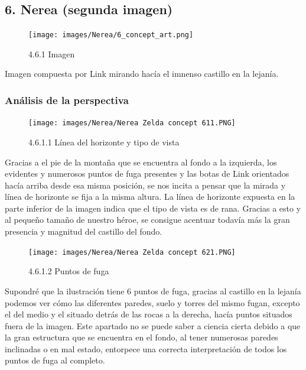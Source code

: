 \documentclass[12pt]{article}
\begin{document}

    \subsection{6. Nerea (segunda imagen)}
    \begin{figure}[H]
      \centering
      \texttt{[image: images/Nerea/6\_concept\_art.png]}
      \caption{\small 4.6.1 Imagen}
    \end{figure}
    Imagen compuesta por Link mirando hacía el imnenso castillo en la lejanía.

    
        \subsubsection{Análisis de la perspectiva}


    \begin{figure}[H]
      \centering
      \texttt{[image: images/Nerea/Nerea Zelda concept 611.PNG]}
      \caption{\small 4.6.1.1 Línea del horizonte y tipo de vista}
    \end{figure}

    Gracias a el pie de la montaña que se encuentra al fondo a la izquierda, los evidentes y numerosos puntos de fuga presentes y las botas de Link orientados hacía arriba desde esa misma posición, se nos incita a pensar que la mirada y línea de horizonte se fija a la misma altura. La línea de horizonte expuesta en la parte inferior de la imagen indica que el tipo de vista es de rana. 
    Gracias a esto y al pequeño tamaño de nuestro héroe, se consigue acentuar todavía más la gran presencia y magnitud del castillo del fondo.

    \begin{figure}[H]
      \centering
      \texttt{[image: images/Nerea/Nerea Zelda concept 621.PNG]}
      \caption{\small 4.6.1.2 Puntos de fuga}
    \end{figure}

    Supondré que la ilustración tiene 6 puntos de fuga, gracias al castillo en la lejanía podemos ver cómo las diferentes paredes, suelo y torres del mismo fugan, excepto el del medio y el situado detrás de las rocas a la derecha, hacía puntos situados fuera de la imagen. Este apartado no se puede saber a ciencia cierta debido a que la gran estructura que se encuentra en el fondo, al tener numerosas paredes inclinadas o en mal estado, entorpece una correcta interpretación de todos los puntos de fuga al completo.
\end{document}
